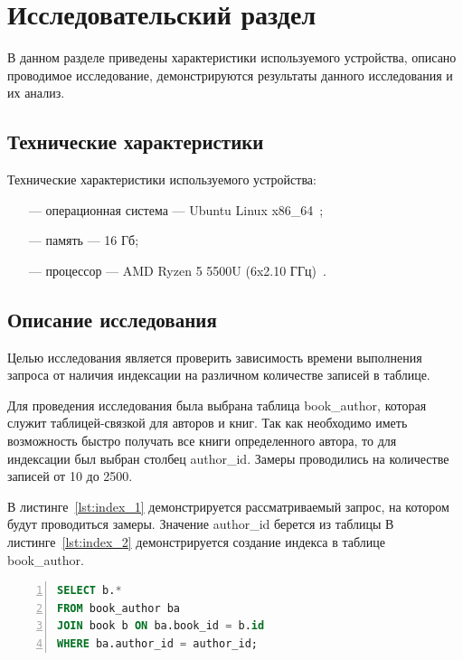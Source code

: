 \chapter{Исследовательский раздел}
В данном разделе приведены характеристики используемого устройства, описано проводимое исследование, демонстрируются результаты данного исследования и их анализ.

\section{Технические характеристики}
Технические характеристики используемого устройства:
\begin{itemize}
	\item[---] операционная система --- Ubuntu Linux x86\_64~\cite{Ubuntu};
	\item[---] память --- 16 Гб;
	\item[---] процессор --- AMD Ryzen 5 5500U (6x2.10 ГГц)~\cite{AMD}.
\end{itemize}

\section{Описание исследования}
Целью исследования является проверить зависимость времени выполнения запроса от наличия индексации на различном количестве записей в таблице.

Для проведения исследования была выбрана таблица book\_author, которая служит таблицей-связкой для авторов и книг. Так как необходимо иметь возможность быстро получать все книги определенного автора, то для индексации был выбран столбец author\_id. Замеры проводились на количестве записей от 10 до 2500.

В листинге~\ref{lst:index_1} демонстрируется рассматриваемый запрос, на котором будут проводиться замеры. Значение author\_id берется из таблицы В листинге~\ref{lst:index_2} демонстрируется создание индекса в таблице book\_author.

\begin{center}
	\captionsetup{justification=raggedright,singlelinecheck=off}
	\begin{lstlisting}[language=sql, frame=single, numbers=left, label=lst:index_1, caption=Рассматриваемый запрос]
SELECT b.*
FROM book_author ba
JOIN book b ON ba.book_id = b.id
WHERE ba.author_id = author_id;
	\end{lstlisting}
\end{center}


